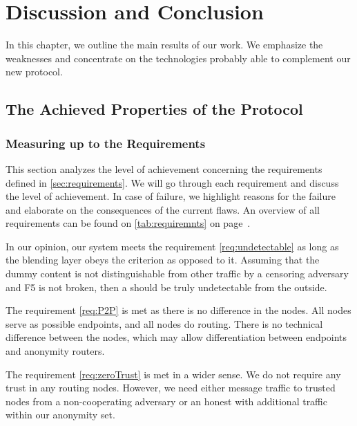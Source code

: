 \part{Discussion and Conclusion}

In this chapter, we outline the main results of our work. We emphasize the weaknesses and concentrate on the technologies probably able to complement our new protocol.

\chapter{The Achieved Properties of the Protocol}
\section{Measuring up to the Requirements\label{sec:reqDiscussion}}
This section analyzes the level of achievement concerning the requirements defined in \cref{sec:requirements}. We will go through each requirement and discuss the level of achievement. In case of failure, we highlight reasons for the failure and elaborate on the consequences of the current flaws. An overview of all requirements can be found on \cref{tab:requiremnts} on page~\pageref{tab:requiremnts}.

In our opinion, our system meets the requirement \ref{req:undetectable} as long as the blending layer obeys the criterion as opposed to it. Assuming that the dummy content is not distinguishable from other traffic by a censoring adversary and F5 is not broken, then a \VortexNode{} should be truly undetectable from the outside.

The requirement \ref{req:P2P} is met as there is no difference in the nodes. All nodes serve as possible endpoints, and all nodes do routing. There is no technical difference between the nodes, which may allow differentiation between endpoints and anonymity routers.

The requirement \ref{req:zeroTrust} is met in a wider sense. We do not require any trust in any routing nodes. However, we need either message traffic to trusted nodes from a non-cooperating adversary or an honest \VortexNodes{} with additional traffic within our anonymity set. 

